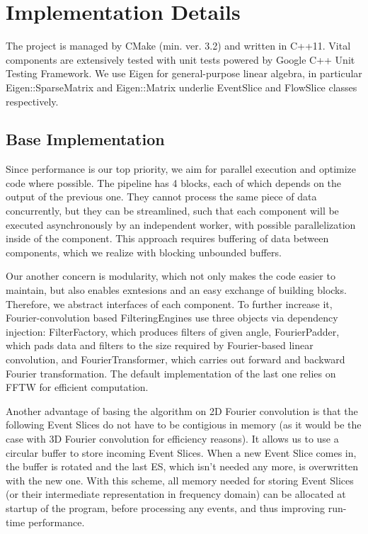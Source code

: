 \section{Implementation Details}
The project is managed by CMake (min. ver. 3.2) and written in C++11. 
Vital components are extensively tested with unit tests powered by Google C++ Unit Testing Framework. 
We use Eigen for general-purpose linear algebra, in particular Eigen::SparseMatrix and Eigen::Matrix underlie EventSlice and FlowSlice classes respectively.

\subsection{Base Implementation}

Since performance is our top priority, we aim for parallel execution and optimize code where possible. 
The pipeline has 4 blocks, each of which depends on the output of the previous one. 
They cannot process the same piece of data concurrently, but they can be streamlined, such that each component will be executed asynchronously by an independent worker, with possible parallelization inside of the component.
This approach requires buffering of data between components, which we realize with blocking unbounded buffers. 

Our another concern is modularity, which not only makes the code easier to maintain, but also enables exntesions and an easy exchange of building blocks. 
Therefore, we abstract interfaces of each component.
To further increase it, Fourier-convolution based FilteringEngines use three objects via dependency injection: FilterFactory, which produces filters of given angle, FourierPadder, which pads data and filters to the size required by Fourier-based linear convolution, and FourierTransformer, which carries out forward and backward Fourier transformation. The default implementation of the last one relies on FFTW for efficient computation.

Another advantage of basing the algorithm on 2D Fourier convolution is that the following Event Slices do not have to be contigious in memory (as it would be the case with 3D Fourier convolution for efficiency reasons).
It allows us to use a circular buffer to store incoming Event Slices.
When a new Event Slice comes in, the buffer is rotated and the last ES, which isn't needed any more, is overwritten with the new one.
With this scheme, all memory needed for storing Event Slices (or their intermediate representation in frequency domain) can be allocated at startup of the program, before processing any events, and thus improving run-time performance.

